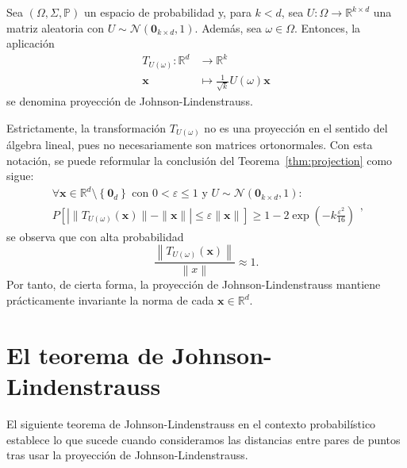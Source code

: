 \begin{definition}
	Sea $\left(\Omega,\Sigma,\mathbb{P}\right)$ un espacio de
	probabilidad y, para $k<d$, sea
	$U\colon\Omega\to\mathbb{R}^{k\times d}$ una matriz aleatoria con
	$U\sim\mathcal{N}\left(\symbf{0}_{k\times d},1\right)$.
	Además, sea $\omega\in\Omega$.
	Entonces, la aplicación
	\begin{equation}\label{eq:projection}
		\begin{aligned}
			T_{U\left(\omega\right)}\colon\mathbb{R}^{d} & \longrightarrow
			\mathbb{R}^{k}                                                 \\
			\symbf{x}                                    & \longmapsto
			\frac{1}{\sqrt{k}}
			U\left(\omega\right)\symbf{x}
		\end{aligned}
	\end{equation}
	se denomina proyección de Johnson-Lindenstrauss.
\end{definition}
Estrictamente, la transformación $T_{U\left(\omega\right)}$ no es una proyección en el sentido del
álgebra lineal, pues no necesariamente son matrices ortonormales.
Con esta notación, se puede reformular la conclusión del Teorema~\ref{thm:projection}
como sigue:
\begin{equation}
	\begin{split}
		\forall\symbf{x}\in\mathbb{R}^{d}\setminus\left\{\symbf{0}_{d}\right\}
		\text{ con }
		0<\varepsilon\leq 1
		\text{ y }
		U\sim\mathcal{N}\left(\symbf{0}_{k\times d},1\right): \\
		P[\left|\|T_{U\left(\omega\right)}\left(\symbf{x}\right)\|-\|\symbf{x}\|\right|\leq\varepsilon\|\symbf{x}\|]
		\geq 1-
		2\exp\left(-k\frac{\varepsilon^{2}}{16}\right)
	\end{split},
\end{equation}
se observa que con alta probabilidad
\begin{equation*}
	\frac{\left\|T_{U\left(\omega\right)}\left(\symbf{x}\right)\right\|}{\left\|x\right\|}\approx 1.
\end{equation*}
Por tanto, de cierta forma, la proyección de Johnson-Lindenstrauss mantiene prácticamente invariante la norma de cada $\symbf{x}\in\mathbb{R}^{d}$.

\section{El teorema de Johnson-Lindenstrauss}

El siguiente teorema de Johnson-Lindenstrauss en el contexto probabilístico establece lo que sucede cuando consideramos
las distancias entre pares de puntos tras usar la proyección de Johnson-Lindenstrauss.


